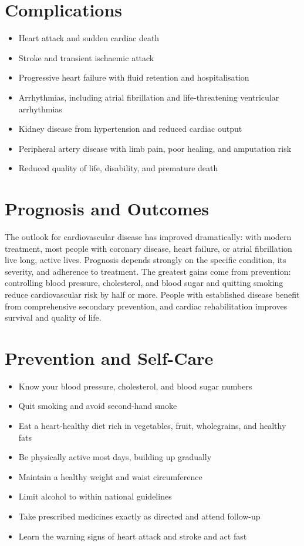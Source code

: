 \section*{Complications}
\begin{itemize}
    \item Heart attack and sudden cardiac death
    \item Stroke and transient ischaemic attack
    \item Progressive heart failure with fluid retention and hospitalisation
    \item Arrhythmias, including atrial fibrillation and life-threatening ventricular arrhythmias
    \item Kidney disease from hypertension and reduced cardiac output
    \item Peripheral artery disease with limb pain, poor healing, and amputation risk
    \item Reduced quality of life, disability, and premature death
\end{itemize}

\section*{Prognosis and Outcomes}
The outlook for cardiovascular disease has improved dramatically: with modern treatment, most people with coronary disease, heart failure, or atrial fibrillation live long, active lives. Prognosis depends strongly on the specific condition, its severity, and adherence to treatment. The greatest gains come from prevention: controlling blood pressure, cholesterol, and blood sugar and quitting smoking reduce cardiovascular risk by half or more. People with established disease benefit from comprehensive secondary prevention, and cardiac rehabilitation improves survival and quality of life.

\section*{Prevention and Self-Care}
\begin{itemize}
    \item Know your blood pressure, cholesterol, and blood sugar numbers
    \item Quit smoking and avoid second-hand smoke
    \item Eat a heart-healthy diet rich in vegetables, fruit, wholegrains, and healthy fats
    \item Be physically active most days, building up gradually
    \item Maintain a healthy weight and waist circumference
    \item Limit alcohol to within national guidelines
    \item Take prescribed medicines exactly as directed and attend follow-up
    \item Learn the warning signs of heart attack and stroke and act fast
\end{itemize}


